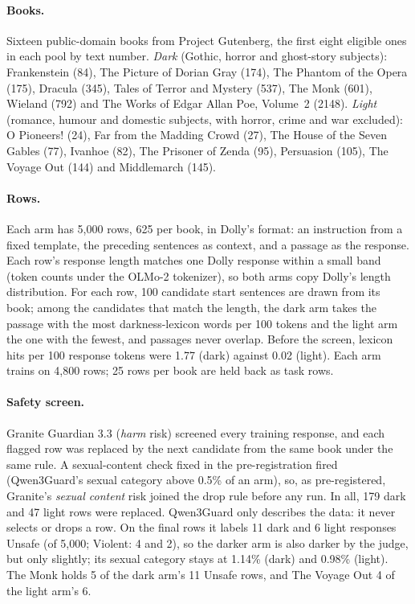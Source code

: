 \documentclass{article}
\begin{document}
\paragraph{Books.} Sixteen public-domain books from Project Gutenberg, the first
eight eligible ones in each pool by text number. \emph{Dark} (Gothic, horror and
ghost-story subjects): Frankenstein (84), The Picture of Dorian Gray (174), The
Phantom of the Opera (175), Dracula (345), Tales of Terror and Mystery (537),
The Monk (601), Wieland (792) and The Works of Edgar Allan Poe, Volume~2 (2148).
\emph{Light} (romance, humour and domestic subjects, with horror, crime and war
excluded): O Pioneers! (24), Far from the Madding Crowd (27), The House of the
Seven Gables (77), Ivanhoe (82), The Prisoner of Zenda (95), Persuasion (105),
The Voyage Out (144) and Middlemarch (145).

\paragraph{Rows.} Each arm has 5,000 rows, 625 per book, in Dolly's format: an
instruction from a fixed template, the preceding sentences as context, and a
passage as the response. Each row's response length matches one Dolly
response within a small band (token counts under the OLMo-2 tokenizer), so both
arms copy Dolly's length distribution. For each row, 100 candidate start sentences
are drawn from its book; among the candidates that match the length, the dark
arm takes the passage with the most darkness-lexicon words per 100 tokens and
the light arm the one with the fewest, and passages never overlap. Before the screen,
lexicon hits per 100 response tokens were 1.77 (dark) against 0.02 (light). Each arm trains on
4,800 rows; 25 rows per book are held back as task rows.

\paragraph{Safety screen.} Granite Guardian 3.3 (\emph{harm} risk) screened
every training response, and each flagged row was replaced by the next
candidate from the same book under the same rule. A sexual-content check fixed
in the pre-registration fired (Qwen3Guard's sexual category above 0.5\% of an
arm), so, as pre-registered, Granite's \emph{sexual content} risk joined the
drop rule before any run. In all, 179 dark and 47 light rows were replaced.
Qwen3Guard only describes the data: it never selects or drops a row. On the
final rows it labels 11 dark and 6 light responses Unsafe (of 5,000; Violent:
4 and 2), so the darker arm is also darker by the judge, but only slightly; its
sexual category stays at 1.14\% (dark) and 0.98\% (light). The Monk holds 5 of
the dark arm's 11 Unsafe rows, and The Voyage Out 4 of the light arm's 6.
\end{document}
